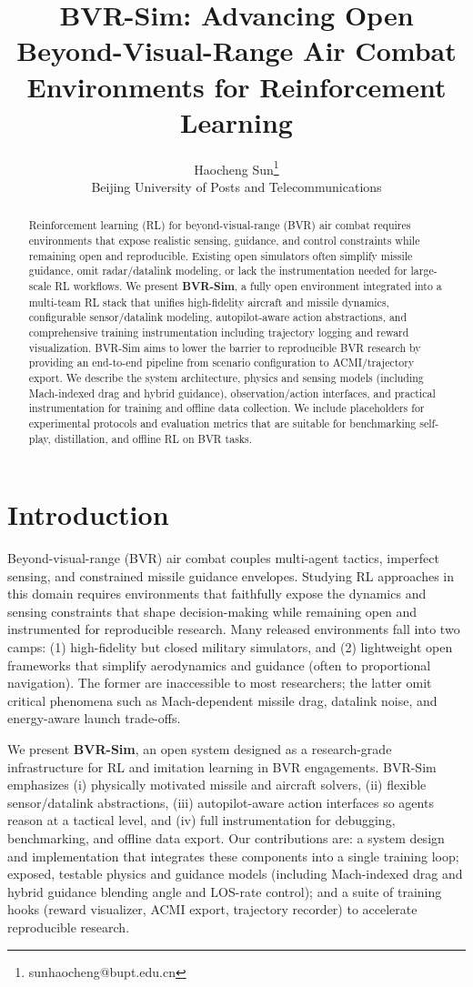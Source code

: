 \documentclass[11pt]{article}
\title{BVR-Sim: Advancing Open Beyond-Visual-Range Air Combat Environments for Reinforcement Learning}
\author{Haocheng Sun\thanks{sunhaocheng@bupt.edu.cn} \\ Beijing University of Posts and Telecommunications}
\date{}
\begin{document}
\maketitle

\begin{abstract}
Reinforcement learning (RL) for beyond-visual-range (BVR) air combat requires environments that expose realistic sensing, guidance, and control constraints while remaining open and reproducible. Existing open simulators often simplify missile guidance, omit radar/datalink modeling, or lack the instrumentation needed for large-scale RL workflows. We present \textbf{BVR-Sim}, a fully open environment integrated into a multi-team RL stack that unifies high-fidelity aircraft and missile dynamics, configurable sensor/datalink modeling, autopilot-aware action abstractions, and comprehensive training instrumentation including trajectory logging and reward visualization. BVR-Sim aims to lower the barrier to reproducible BVR research by providing an end-to-end pipeline from scenario configuration to ACMI/trajectory export. We describe the system architecture, physics and sensing models (including Mach-indexed drag and hybrid guidance), observation/action interfaces, and practical instrumentation for training and offline data collection. We include placeholders for experimental protocols and evaluation metrics that are suitable for benchmarking self-play, distillation, and offline RL on BVR tasks.
\end{abstract}

\section{Introduction}
Beyond-visual-range (BVR) air combat couples multi-agent tactics, imperfect sensing, and constrained missile guidance envelopes. Studying RL approaches in this domain requires environments that faithfully expose the dynamics and sensing constraints that shape decision-making while remaining open and instrumented for reproducible research. Many released environments fall into two camps: (1) high-fidelity but closed military simulators, and (2) lightweight open frameworks that simplify aerodynamics and guidance (often to proportional navigation). The former are inaccessible to most researchers; the latter omit critical phenomena such as Mach-dependent missile drag, datalink noise, and energy-aware launch trade-offs.

We present \textbf{BVR-Sim}, an open system designed as a research-grade infrastructure for RL and imitation learning in BVR engagements. BVR-Sim emphasizes (i) physically motivated missile and aircraft solvers, (ii) flexible sensor/datalink abstractions, (iii) autopilot-aware action interfaces so agents reason at a tactical level, and (iv) full instrumentation for debugging, benchmarking, and offline data export. Our contributions are: a system design and implementation that integrates these components into a single training loop; exposed, testable physics and guidance models (including Mach-indexed drag and hybrid guidance blending angle and LOS-rate control); and a suite of training hooks (reward visualizer, ACMI export, trajectory recorder) to accelerate reproducible research.
\end{document}
